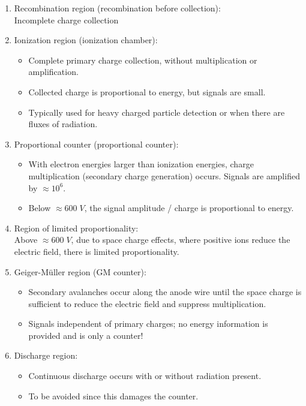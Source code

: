 \begin{enumerate}
    \item Recombination region (recombination before collection):\\
    Incomplete charge collection
    \item Ionization region (ionization chamber):
    \begin{itemize}
        \item Complete primary charge collection, without multiplication or amplification.
        \item Collected charge is proportional to energy, but signals are small. 
        \item Typically used for heavy charged particle detection or when there are fluxes of radiation.
    \end{itemize}
    \item Proportional counter (proportional counter):
    \begin{itemize}
        \item With electron energies larger than ionization energies, charge multiplication (secondary charge generation) occurs. Signals are amplified by $\approx 10^6$.
        \item Below $\approx600\;V$, the signal amplitude / charge is proportional to energy.
    \end{itemize}
    \item Region of limited proportionality:\\
    Above $\approx600\;V$, due to space charge effects, where positive ions reduce the electric field, there is limited proportionality. 
    \item Geiger-Müller region (GM counter):
    \begin{itemize}
        \item Secondary avalanches occur along the anode wire until the space charge is sufficient to reduce the electric field and suppress multiplication. 
        \item Signals independent of primary charges; no energy information is provided and is only a counter!
    \end{itemize}
    \item Discharge region:
    \begin{itemize}
        \item Continuous discharge occurs with or without radiation present.
        \item To be avoided since this damages the counter.
    \end{itemize}
\end{enumerate}
